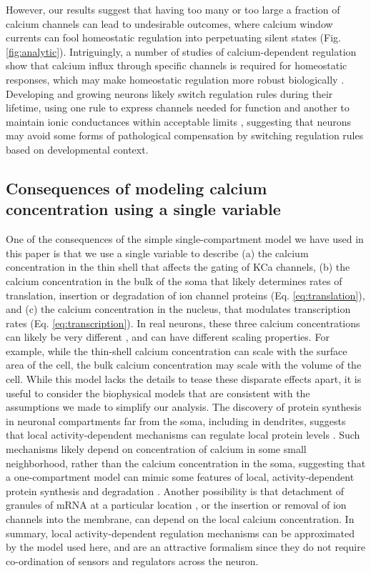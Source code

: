 \documentclass[9pt,lineno]{elife}
\begin{document}
However, our results suggest that having too many or too large a fraction of calcium channels can lead to undesirable outcomes, where calcium window currents can fool homeostatic regulation into perpetuating silent states (Fig. \ref{fig:analytic}). Intriguingly, a number of studies of calcium-dependent regulation show that calcium influx through specific channels is required for homeostatic responses, which may make homeostatic regulation more robust biologically \citep{OLeary:2010hq,wheeler2012cav1}. Developing and growing neurons likely switch regulation rules during their lifetime, using one rule to express channels needed for function and another to maintain ionic conductances within acceptable limits  \citep{Desai:1999ib}, suggesting that neurons may avoid some forms of pathological compensation by switching regulation rules based on developmental context. 


\subsection{Consequences of modeling calcium concentration using a single variable}

One of the consequences of the simple single-compartment model we have used in this paper is that we use a single variable to describe (a) the calcium concentration in the thin shell that affects the gating of KCa channels, (b) the calcium concentration in the bulk  of the soma that likely determines rates of translation, insertion or degradation of ion channel proteins (Eq. \ref{eq:translation}), and (c) the calcium concentration in the nucleus, that modulates transcription rates (Eq. \ref{eq:transcription}). In real neurons, these three calcium concentrations can likely be very different \citep{Sala:1990hi, DeSchutter:1998tl}, and can have different scaling properties. For example, while the thin-shell calcium concentration can scale with the surface area of the cell, the bulk calcium concentration may scale with the volume of the cell. While this model lacks the details to tease these disparate effects apart, it is useful to consider the biophysical models that are consistent with the assumptions we made to simplify our analysis. The discovery of protein synthesis in neuronal compartments far from the soma, including in dendrites, suggests that local activity-dependent mechanisms can regulate local protein levels \citep{Steward:1982tx,Miller:2002wh,Sutton:2004fq}. Such mechanisms likely depend on concentration of calcium in some small neighborhood, rather than the calcium concentration in the soma, suggesting that a one-compartment model can mimic some features of local, activity-dependent protein synthesis and degradation \citep{Ouyang:1999ud}. Another possibility is that detachment of granules of mRNA at a particular location \citep{Doyle:2011be}, or the insertion or removal of ion channels into the membrane, can depend on the local calcium concentration. In summary, local activity-dependent regulation mechanisms can be approximated by the model used here, and are an attractive formalism since they do not require co-ordination of sensors and regulators across the neuron. 
\end{document}
